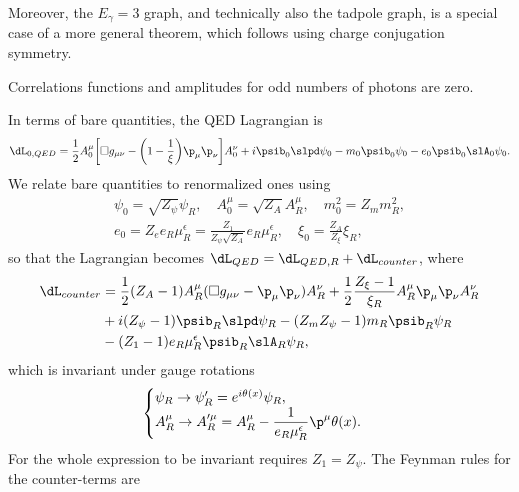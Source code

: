 Moreover, the $E_\gamma = 3$ graph, and technically also the tadpole graph, is a special case of a more general theorem, which follows using charge conjugation symmetry.
\begin{teo}
    Correlations functions and amplitudes for odd numbers of photons are zero.
\end{teo}
In terms of bare quantities, the QED Lagrangian is
\begin{equation}
    \dL_{0,QED} = \frac{1}{2}A_0^\mu\bigg[\square g_{\mu\nu} - \bigg(1 - \frac{1}{\xi}\bigg)\p_\mu \p_\nu\bigg]A_0^\nu + i\psib_0\slpd\psi_0 - m_0\psib_0\psi_0 - e_0\psib_0\slA_0\psi_0.
\end{equation}
We relate bare quantities to renormalized ones using
\begin{gather}
    \psi_0 = \sqrt{Z_\psi}\psi_R,\quad A_0^\mu = \sqrt{Z_A} A_R^\mu,\quad m_0^2 = Z_mm_R^2, \\
    e_0 = Z_ee_R\mu_R^\epsilon = \frac{Z_1}{Z_\psi\sqrt{Z_A}}e_R\mu_R^\epsilon,\quad \xi_0 = \frac{Z_A}{Z_\xi}\xi_R,
\end{gather}
so that the Lagrangian becomes $\dL_{QED} = \dL_{QED,R} + \dL_{counter}$, where
\begin{equation}
    \begin{split}
        \dL_{counter} &= \frac{1}{2}(Z_A - 1)A_R^\mu(\square g_{\mu\nu} - \p_\mu\p_\nu)A_R^\nu + \frac{1}{2}\frac{Z_\xi - 1}{\xi_R}A_R^\mu\p_\mu\p_\nu A^\nu_R \\
        &+ i(Z_\psi - 1)\psib_R\slpd\psi_R - (Z_mZ_\psi - 1)m_R\psib_R\psi_R \\
        &- (Z_1 - 1)e_R\mu_R^\epsilon\psib_R\slA_R\psi_R,
    \end{split}
\end{equation}
which is invariant under gauge rotations
\begin{equation}
    \begin{cases}
        \psi_R \to \psi_R' = e^{i\theta(x)}\psi_R, \\
        A_R^\mu \to A_R'^\mu = A_R^\mu - \dfrac{1}{e_R\mu_R^\epsilon}\p^\mu\theta(x).
    \end{cases}
\end{equation}
For the whole expression to be invariant requires $Z_1 = Z_\psi$. The Feynman rules for the counter-terms are
